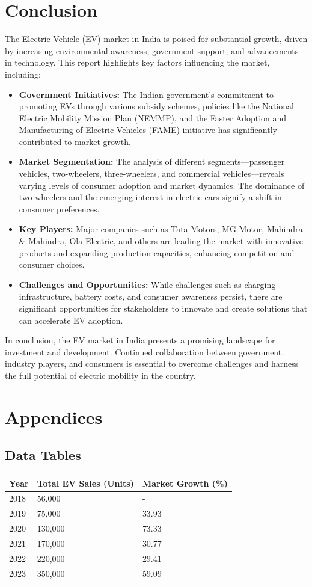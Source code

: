 \documentclass[a4paper,12pt]{report}
\begin{document}
\chapter{Conclusion}
The Electric Vehicle (EV) market in India is poised for substantial growth, driven by increasing environmental awareness, government support, and advancements in technology. This report highlights key factors influencing the market, including:
\begin{itemize}
    \item \textbf{Government Initiatives: }
    The Indian government's commitment to promoting EVs through various subsidy schemes, policies like the National Electric Mobility Mission Plan (NEMMP), and the Faster Adoption and Manufacturing of Electric Vehicles (FAME) initiative has significantly contributed to market growth.
    \item \textbf{Market Segmentation: }
    The analysis of different segments—passenger vehicles, two-wheelers, three-wheelers, and commercial vehicles—reveals varying levels of consumer adoption and market dynamics. The dominance of two-wheelers and the emerging interest in electric cars signify a shift in consumer preferences.
    \item \textbf{Key Players: }
    Major companies such as Tata Motors, MG Motor, Mahindra \& Mahindra, Ola Electric, and others are leading the market with innovative products and expanding production capacities, enhancing competition and consumer choices.
    \item \textbf{Challenges and Opportunities: }
    While challenges such as charging infrastructure, battery costs, and consumer awareness persist, there are significant opportunities for stakeholders to innovate and create solutions that can accelerate EV adoption.

\end{itemize}

In conclusion, the EV market in India presents a promising landscape for investment and development. Continued collaboration between government, industry players, and consumers is essential to overcome challenges and harness the full potential of electric mobility in the country.

\newpage


\appendix
\chapter{Appendices}
\section{Data Tables}
\begin{longtable}{|l|l|l|}
\hline
\textbf{Year} & \textbf{Total EV Sales (Units)} & \textbf{Market Growth (\%)} \\
\hline
2018 & 56,000 & - \\
2019 & 75,000 & 33.93 \\
2020 & 130,000 & 73.33 \\
2021 & 170,000 & 30.77 \\
2022 & 220,000 & 29.41 \\
2023 & 350,000 & 59.09 \\
\hline
\end{longtable}
\end{document}
